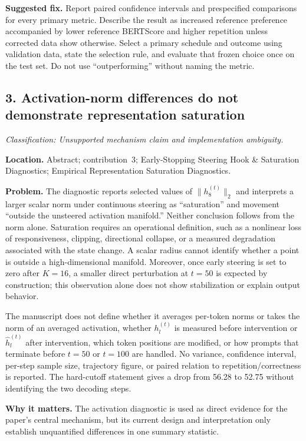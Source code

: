 \documentclass[11pt]{article}
\newcommand{\findinglabel}[1]{\textbf{#1}}
\newcommand{\classification}[1]{\textit{Classification: #1.}}
\begin{document}
\findinglabel{Suggested fix.} Report paired confidence intervals and prespecified comparisons for every primary metric.  Describe the result as increased reference preference accompanied by lower reference BERTScore and higher repetition unless corrected data show otherwise.  Select a primary schedule and outcome using validation data, state the selection rule, and evaluate that frozen choice once on the test set.  Do not use ``outperforming'' without naming the metric.

\subsection*{3. Activation-norm differences do not demonstrate representation saturation}

\classification{Unsupported mechanism claim and implementation ambiguity}

\findinglabel{Location.} Abstract; contribution~3; Early-Stopping Steering Hook \& Saturation Diagnostics; Empirical Representation Saturation Diagnostics.

\findinglabel{Problem.} The diagnostic reports selected values of $\|h_8^{(t)}\|_2$ and interprets a larger scalar norm under continuous steering as ``saturation'' and movement ``outside the unsteered activation manifold.''  Neither conclusion follows from the norm alone.  Saturation requires an operational definition, such as a nonlinear loss of responsiveness, clipping, directional collapse, or a measured degradation associated with the state change.  A scalar radius cannot identify whether a point is outside a high-dimensional manifold.  Moreover, once early steering is set to zero after $K=16$, a smaller direct perturbation at $t=50$ is expected by construction; this observation alone does not show stabilization or explain output behavior.

The manuscript does not define whether it averages per-token norms or takes the norm of an averaged activation, whether $h_l^{(t)}$ is measured before intervention or $\hat h_l^{(t)}$ after intervention, which token positions are modified, or how prompts that terminate before $t=50$ or $t=100$ are handled.  No variance, confidence interval, per-step sample size, trajectory figure, or paired relation to repetition/correctness is reported.  The hard-cutoff statement gives a drop from 56.28 to 52.75 without identifying the two decoding steps.

\findinglabel{Why it matters.} The activation diagnostic is used as direct evidence for the paper's central mechanism, but its current design and interpretation only establish unquantified differences in one summary statistic.
\end{document}
